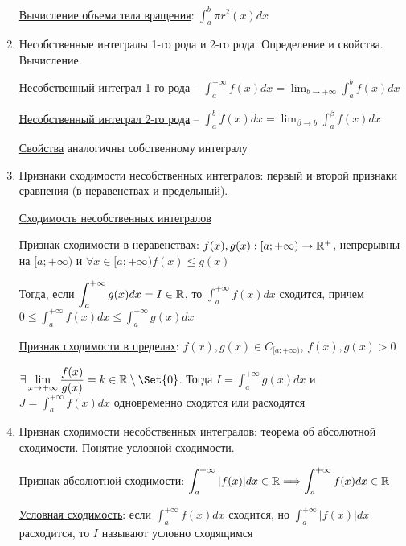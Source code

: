 \documentclass[12pt]{article}
\begin{document}
\begin{enumerate}
        \hyperlink{volumeofbodyofrevolution}{Вычисление объема тела вращения}: $\int_a^b \pi r^2(x) dx$


        \item Несобственные интегралы 1-го рода и 2-го рода. Определение и свойства. Вычисление.

        \hyperlink{improperintegralfirstkind}{Несобственный интеграл 1-го рода} -- $\int^{+\infty}_{a} f(x) dx = \lim_{b \to +\infty} \int^{b}_{a} f(x) dx$

        \hyperlink{improperintegralsecondkind}{Несобственный интеграл 2-го рода} -- $\int^{b}_{a} f(x) dx = \lim_{\beta \to b} \int^{\beta}_{a} f(x) dx$

        \hyperlink{improperintegralproperties}{Свойства} аналогичны собственному интегралу

        \item Признаки сходимости несобственных интегралов: первый и второй признаки сравнения (в неравенствах и предельный).

        \hyperlink{improperintegralconvergence}{Сходимость несобственных интегралов}

        \hyperlink{improperintegralconvergenceininequalities}{Признак сходимости в неравенствах}: $f(x), g(x) : [a;+\infty) \to \mathbb{R}^+$, непрерывны на $[a;+\infty)$ и $\forall x \in [a;+\infty) f(x) \leq g(x)$

        Тогда, если $\displaystyle \int^{+\infty}_{a} g(x) dx = I \in \mathbb{R}$, то $\displaystyle \int^{+\infty}_{a} f(x) dx$ сходится,
        причем $\displaystyle0 \leq \int^{+\infty}_{a} f(x) dx \leq \int^{+\infty}_{a} g(x) dx$

        \hyperlink{improperintegralconvergenceinlimits}{Признак сходимости в пределах}: $f(x), g(x) \in C_{[a;+\infty)}$, $f(x), g(x) > 0$

        $\displaystyle \exists \lim_{x\to+\infty} \frac{f(x)}{g(x)} = k \in \Real \setminus \Set{0}$.
        Тогда $\displaystyle I = \int^{+\infty}_{a} g(x)dx$ и $\displaystyle J = \int^{+\infty}_{a} f(x)dx$ одновременно сходятся или расходятся

        \item Признак сходимости несобственных интегралов: теорема об абсолютной сходимости. Понятие условной сходимости.

        \hyperlink{improperintegralabsoluteconvergence}{Признак абсолютной сходимости}: $\displaystyle \int^{+\infty}_{a} |f(x)| dx \in \mathbb{R} \Longrightarrow \int^{+\infty}_{a} f(x) dx \in \mathbb{R}$

        \hyperlink{improperintegralconditionalconvergence}{Условная сходимость}: если $\displaystyle \int^{+\infty}_{a} f(x) dx$ сходится, но $\displaystyle \int^{+\infty}_{a} |f(x)| dx$ расходится, то $I$ называют условно сходящимся


    \end{enumerate}
\end{document}
